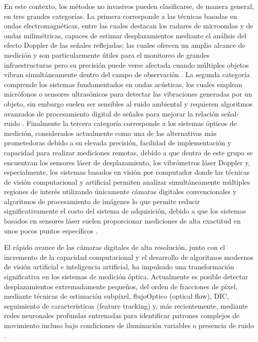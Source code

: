 En este contexto, los métodos no invasivos pueden clasificarse, de manera general, en tres grandes categorías. La primera corresponde a las técnicas basadas en ondas electromagnéticas, entre las cuales destacan los radares de microondas y de ondas milimétricas, capaces de estimar desplazamientos mediante el análisis del efecto Doppler de las señales reflejadas; las cuales ofrecen un amplio alcance de medición y son particularmente útiles para el monitoreo de grandes infraestructuras pero su precisión puede verse afectada cuando múltiples objetos vibran simultáneamente dentro del campo de observación \cite{cheng2025vision}. La segunda categoría comprende los sistemas fundamentados en ondas acústicas, los cuales emplean micrófonos o sensores ultrasónicos para detectar las vibraciones generadas por un objeto, sin embargo suelen ser sensibles al ruido ambiental y requieren algoritmos avanzados de procesamiento digital de señales para mejorar la relación señal-ruido \cite{cheng2025vision}. Finalmente la tercera categoría corresponde a los sistemas ópticos de medición, considerados actualmente como una de las alternativas más prometedoras debido a su elevada precisión, facilidad de implementación y capacidad para realizar mediciones remotas, debido a que dentro de este grupo se encuentran los sensores láser de desplazamiento, los vibrómetros láser Doppler y, especialmente, los sistemas basados en visión por computador donde las técnicas de visión computacional y artificial permiten analizar simultáneamente múltiples regiones de interés utilizando únicamente cámaras digitales convencionales y algoritmos de procesamiento de imágenes lo que permite reducir significativamente el costo del sistema de adquisición, debido a que los sistemas basados en sensores láser suelen proporcionar mediciones de alta exactitud en unos pocos puntos específicos \cite{cheng2025vision}.

El rápido avance de las cámaras digitales de alta resolución, junto con el incremento de la capacidad computacional y el desarrollo de algoritmos modernos de visión artificial e inteligencia artificial, ha impulsado una transformación significativa en los sistemas de medición óptica. Actualmente es posible detectar desplazamientos extremadamente pequeños, del orden de fracciones de píxel, mediante técnicas de estimación subpíxel, \gls{flujoOptico} (optical flow), \gls{DIC}, seguimiento de características (feature tracking) y, más recientemente, mediante redes neuronales profundas entrenadas para identificar patrones complejos de movimiento incluso bajo condiciones de iluminación variables o presencia de ruido \cite{fleet2006flow,sun2018pwc,cheng2025vision}.

